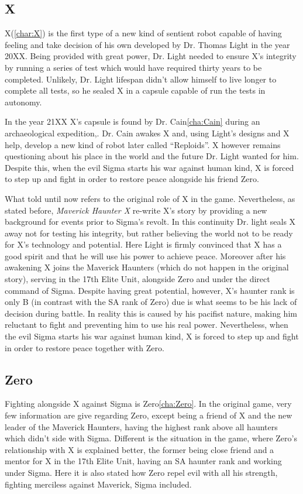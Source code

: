 \subsection{X}
X(\ref{char:X}) is the first type of a new kind of sentient robot capable of having feeling and take decision of his own developed by Dr. Thomas Light in the year 20XX. Being provided with great power, Dr. Light needed to ensure X's integrity by running a series of test which would have required thirty years to be completed. Unlikely, Dr. Light lifespan didn't allow himself to live longer to complete all tests, so he sealed X in a capsule capable of run the tests in autonomy.


In the year 21XX X's capsule is found by Dr. Cain\ref{cha:Cain} during an archaeological expedition\cite{X:Manual},\cite{wiki:Cain_journal}. Dr. Cain awakes X and, using Light's designs and X help, develop a new kind of robot later called ``Reploids''. X however remains questioning about his place in the world and the future Dr. Light wanted for him. Despite this, when the evil Sigma starts his war against human kind, X is forced to step up and fight in order to restore peace alongside his friend Zero. 


What told until now refers to the original role of X in the \x game. Nevertheless, as stated before, \textit{Maverick Haunter X} re-write X's story by providing a new background for events prior to Sigma's revolt. In this continuity Dr. light seals X away not for testing his integrity, but rather believing the world not to be ready for X's technology and potential. Here Light is firmly convinced that X has a good spirit and that he will use his power to achieve peace\cite{wiki:MM_MHX_X}. Moreover after his awakening X joins the Maverick Haunters (which do not happen in the original story), serving in the 17th Elite Unit, alongside Zero and under the direct command of Sigma. Despite having great potential, however, X's haunter rank is only B (in contrast with the SA rank of Zero) due is what seems to be his lack of decision during battle. In reality this is caused by his pacifist nature, making him reluctant to fight and preventing him to use his real power\cite{Xcoll1:Manual_X1}. Nevertheless, when the evil Sigma starts his war against human kind, X is forced to step up and fight in order to restore peace together with Zero.

\subsection{Zero}
Fighting alongside X against Sigma is Zero\ref{cha:Zero}. In the original \x game, very few information are give regarding Zero, except being a friend of X and the new leader of the Maverick Haunters\cite{X:Manual}, having the highest rank above all haunters which didn't side with Sigma. 
Different is the situation in the \mhx game, where Zero's relationship with X is explained better, the former being close friend and a mentor for X in the 17th Elite Unit, having an SA haunter rank and working under Sigma. Here it is also stated how Zero repel evil with all his strength, fighting merciless against Maverick, Sigma included\cite{Xcoll1:Manual_X1}.  

